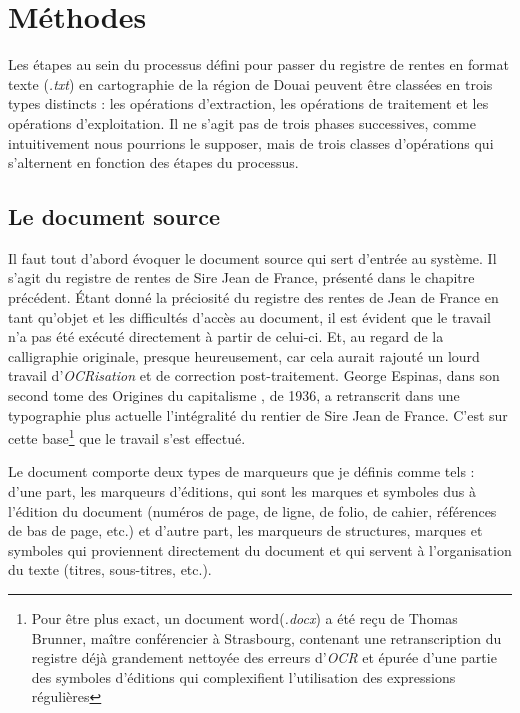 \chapter{Méthodes}
Les étapes au sein du processus défini pour passer du registre de rentes en format texte (\textit{.txt}) en cartographie de la région de Douai peuvent être classées en trois types distincts : les opérations d’extraction, les opérations de traitement et les opérations d’exploitation. Il ne s’agit pas de trois phases successives, comme intuitivement nous pourrions le supposer, mais de trois classes d'opérations qui s’alternent en fonction des étapes du processus.

\section{Le document source}
Il faut tout d'abord évoquer le document source qui sert d'entrée au système.
Il s'agit du registre de rentes de Sire Jean de France, présenté  dans le chapitre précédent.
Étant donné la préciosité  du registre des rentes de Jean de France en tant qu'objet et les difficultés d'accès au document, il est évident que le travail n'a pas été exécuté directement à partir de celui-ci. Et, au regard de la calligraphie originale, presque heureusement, car cela aurait rajouté un lourd travail d'\textit{OCRisation} et de correction post-traitement. 
George Espinas, dans son second tome des \og Origines du capitalisme \fg , de 1936, a retranscrit dans une typographie plus actuelle l'intégralité du rentier de Sire Jean de France. C'est sur cette base\footnote{Pour être plus exact, un document word(\textit{.docx}) a été reçu de Thomas Brunner, maître conférencier à Strasbourg, contenant une retranscription du registre déjà  grandement nettoyée des erreurs d'\textit{OCR} et épurée d'une partie des symboles d'éditions qui complexifient l'utilisation des  expressions régulières} que le travail s'est effectué.

Le document comporte deux types de marqueurs que je définis comme tels : d'une part, les marqueurs d'éditions, qui sont les marques et symboles dus à l'édition du document (numéros de page, de ligne, de folio, de cahier, références de bas de page, etc.) et d'autre part, les marqueurs de structures, marques et symboles qui proviennent directement du document et qui servent à l'organisation du texte (titres, sous-titres, etc.).

